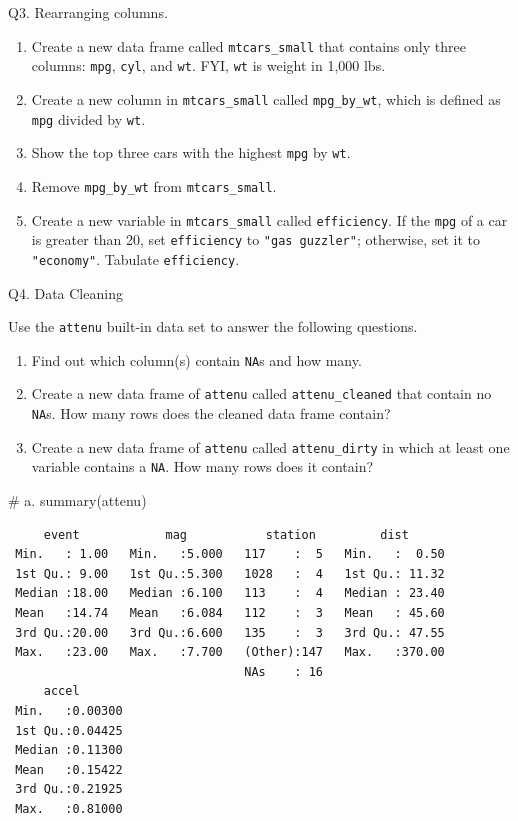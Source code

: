 \documentclass[
  letterpaper,
  DIV=11,
  numbers=noendperiod]{scrreprt}
\newenvironment{Shaded}{\begin{snugshade}}{\end{snugshade}}
\newcommand{\CommentTok}[1]{\textcolor[rgb]{0.37,0.37,0.37}{#1}}
\newcommand{\FunctionTok}[1]{\textcolor[rgb]{0.28,0.35,0.67}{#1}}
\newcommand{\NormalTok}[1]{\textcolor[rgb]{0.00,0.23,0.31}{#1}}
\begin{document}
Q3. Rearranging columns.

\begin{enumerate}
\def\labelenumi{\alph{enumi}.}
\item
  Create a new data frame called \texttt{mtcars\_small} that contains
  only three columns: \texttt{mpg}, \texttt{cyl}, and \texttt{wt}. FYI,
  \texttt{wt} is weight in 1,000 lbs.
\item
  Create a new column in \texttt{mtcars\_small} called
  \texttt{mpg\_by\_wt}, which is defined as \texttt{mpg} divided by
  \texttt{wt}.
\item
  Show the top three cars with the highest \texttt{mpg} by \texttt{wt}.
\item
  Remove \texttt{mpg\_by\_wt} from \texttt{mtcars\_small}.
\item
  Create a new variable in \texttt{mtcars\_small} called
  \texttt{efficiency}. If the \texttt{mpg} of a car is greater than 20,
  set \texttt{efficiency} to \texttt{"gas\ guzzler"}; otherwise, set it
  to \texttt{"economy"}. Tabulate \texttt{efficiency}.
\end{enumerate}

Q4. Data Cleaning

Use the \texttt{attenu} built-in data set to answer the following
questions.

\begin{enumerate}
\def\labelenumi{\alph{enumi}.}
\item
  Find out which column(s) contain \texttt{NA}s and how many.
\item
  Create a new data frame of \texttt{attenu} called
  \texttt{attenu\_cleaned} that contain no \texttt{NA}s. How many rows
  does the cleaned data frame contain?
\item
  Create a new data frame of \texttt{attenu} called
  \texttt{attenu\_dirty} in which at least one variable contains a
  \texttt{NA}. How many rows does it contain?
\end{enumerate}

\begin{Shaded}
\begin{Highlighting}[]
\CommentTok{\# a.}
\FunctionTok{summary}\NormalTok{(attenu)}
\end{Highlighting}
\end{Shaded}

\begin{verbatim}
     event            mag           station         dist       
 Min.   : 1.00   Min.   :5.000   117    :  5   Min.   :  0.50  
 1st Qu.: 9.00   1st Qu.:5.300   1028   :  4   1st Qu.: 11.32  
 Median :18.00   Median :6.100   113    :  4   Median : 23.40  
 Mean   :14.74   Mean   :6.084   112    :  3   Mean   : 45.60  
 3rd Qu.:20.00   3rd Qu.:6.600   135    :  3   3rd Qu.: 47.55  
 Max.   :23.00   Max.   :7.700   (Other):147   Max.   :370.00  
                                 NAs    : 16                   
     accel        
 Min.   :0.00300  
 1st Qu.:0.04425  
 Median :0.11300  
 Mean   :0.15422  
 3rd Qu.:0.21925  
 Max.   :0.81000  
                  
\end{verbatim}
\end{document}
